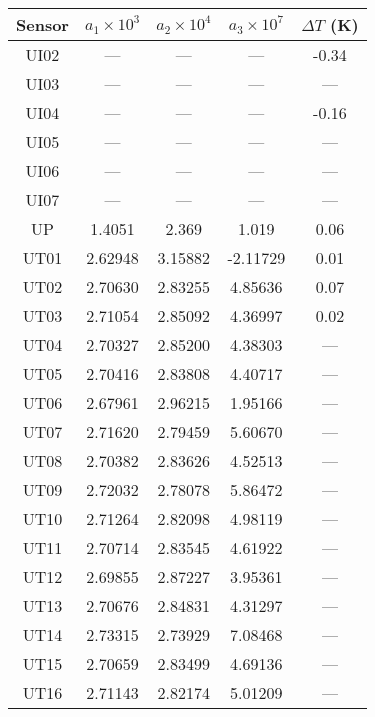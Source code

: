 \documentclass[utf8]{article}
\begin{document}
\begin{table}
{\begin{minipage}{85mm}
\begin{tabular}{ccccc}
          \hline
          Sensor & $a_1\times10^{3}$ & $a_2\times10^{4}$
                 & $a_3\times10^{7}$ & $\Delta T$ (K) \\
          \hline
          UI02 &   ---   &   ---   &   ---   & -0.34 \\
          UI03 &   ---   &   ---   &   ---   &  ---  \\
          UI04 &   ---   &   ---   &   ---   & -0.16 \\
          UI05 &   ---   &   ---   &   ---   &  ---  \\
          UI06 &   ---   &   ---   &   ---   &  ---  \\
          UI07 &   ---   &   ---   &   ---   &  ---  \\
          UP   & 1.4051  & 2.369   & 1.019   &  0.06 \\
          UT01 & 2.62948 & 3.15882 &-2.11729 &  0.01 \\
          UT02 & 2.70630 & 2.83255 & 4.85636 &  0.07 \\
          UT03 & 2.71054 & 2.85092 & 4.36997 &  0.02 \\
          UT04 & 2.70327 & 2.85200 & 4.38303 &  ---  \\
          UT05 & 2.70416 & 2.83808 & 4.40717 &  ---  \\
          UT06 & 2.67961 & 2.96215 & 1.95166 &  ---  \\
          UT07 & 2.71620 & 2.79459 & 5.60670 &  ---  \\
          UT08 & 2.70382 & 2.83626 & 4.52513 &  ---  \\
          UT09 & 2.72032 & 2.78078 & 5.86472 &  ---  \\
          UT10 & 2.71264 & 2.82098 & 4.98119 &  ---  \\
          UT11 & 2.70714 & 2.83545 & 4.61922 &  ---  \\
          UT12 & 2.69855 & 2.87227 & 3.95361 &  ---  \\
          UT13 & 2.70676 & 2.84831 & 4.31297 &  ---  \\
          UT14 & 2.73315 & 2.73929 & 7.08468 &  ---  \\
          UT15 & 2.70659 & 2.83499 & 4.69136 &  ---  \\
          UT16 & 2.71143 & 2.82174 & 5.01209 &  ---  \\
          \hline
        \end{tabular}
      \end{minipage}}
    \end{table}
\end{document}
